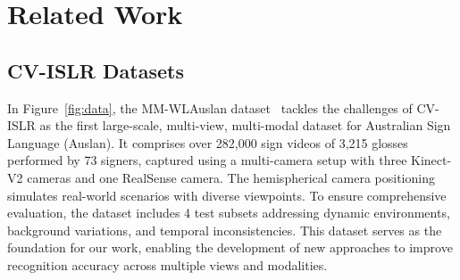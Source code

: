 \section{Related Work}
\subsection{CV-ISLR Datasets} \label{sec:dataset}
In Figure~\ref{fig:data}, the MM-WLAuslan dataset~\cite{shen2024mm} tackles the challenges of CV-ISLR as the first large-scale, multi-view, multi-modal dataset for Australian Sign Language (Auslan). It comprises over 282,000 sign videos of 3,215 glosses performed by 73 signers, captured using a multi-camera setup with three Kinect-V2 cameras and one RealSense camera. The hemispherical camera positioning simulates real-world scenarios with diverse viewpoints. To ensure comprehensive evaluation, the dataset includes 4 test subsets addressing dynamic environments, background variations, and temporal inconsistencies. This dataset serves as the foundation for our work, enabling the development of new approaches to improve recognition accuracy across multiple views and modalities.

